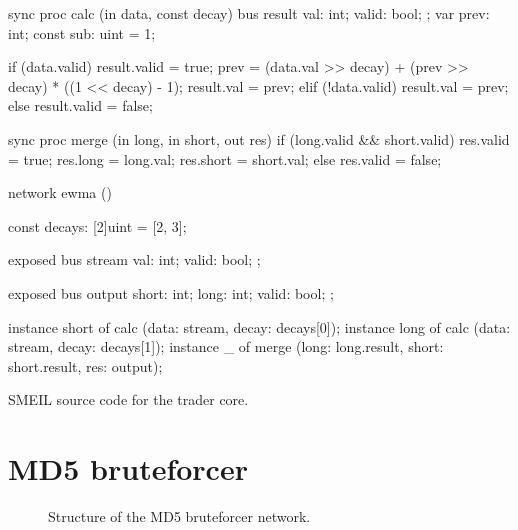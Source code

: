 \begin{widefigure}
  \begin{smeilcode2}
sync proc calc (in data, const decay)
  bus result {
    val: int;
    valid: bool;
  };
  var prev: int;
  const sub: uint = 1;

{
  if (data.valid) {
    result.valid = true;
    prev = (data.val >> decay) +
      (prev >> decay) *
      ((1 << decay) - 1);
    result.val = prev;
  } elif (!data.valid) {
    result.val = prev;
  } else {
    result.valid = false;
  }
}

sync proc merge (in long,
                 in short, out res) {
  if (long.valid && short.valid) {
    res.valid = true;
    res.long = long.val;
    res.short = short.val;
  } else {
    res.valid = false;
  }
}

network ewma () {
  const decays: [2]uint = [2, 3];

  exposed bus stream {
    val: int;
    valid: bool;
  };

  exposed bus output {
    short: int;
    long: int;
    valid: bool;
  };

  instance short of calc 
      (data: stream, decay: decays[0]);
  instance long of calc
      (data: stream, decay: decays[1]);
  instance _ of merge
      (long: long.result,
       short: short.result,
       res: output);
}
\end{smeilcode2}
\caption{SMEIL source code for the trader core.}
\label{fig:tradesrc}

\end{widefigure}

\section{MD5 bruteforcer}
\begin{figure}%
  \centering
  \caption{Structure of the MD5 bruteforcer network.}
  \label{fig:md5net}
\end{figure}

